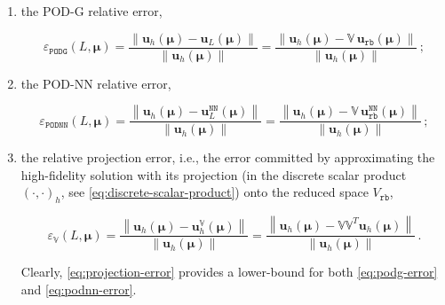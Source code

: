 \documentclass[longtitle]{elsarticle}
\numberwithin{equation}{section}
\theoremstyle{theorem}
\theoremstyle{definition}
\theoremstyle{remark}
\theoremstyle{proposition}
\numberwithin{figure}{section}
\newcommand{\norm}[1]{\left\lVert#1\right\rVert}
\newcommand{\bg}[1]{\boldsymbol{#1}}
\begin{document}
		\begin{enumerate}[label=(\alph*)]
			\item the POD-G relative error,
			\begin{linenomath}\begin{linenomath}\begin{equation}
				\label{eq:podg-error}
				\varepsilon_{\texttt{PODG}}^{}(L, \bg{\mu}) = \dfrac{\norm{\mathbf{u}_h(\bg{\mu}) - \mathbf{u}_L(\bg{\mu})}}{\norm{\mathbf{u}_h(\bg{\mu})}} = \dfrac{\norm{\mathbf{u}_h(\bg{\mu}) - \mathbb{V} \, \mathbf{u}_{\texttt{rb}}(\bg{\mu})}}{\norm{\mathbf{u}_h(\bg{\mu})}} \, ;
			\end{equation}\end{linenomath}\end{linenomath} 
			\item the POD-NN relative error,
			\begin{linenomath}\begin{linenomath}\begin{equation}
				\label{eq:podnn-error}
				\varepsilon_{\texttt{PODNN}}^{}(L, \bg{\mu}) = \dfrac{\norm{\mathbf{u}_h(\bg{\mu}) - \mathbf{u}_L^{\texttt{NN}}(\bg{\mu})}}{\norm{\mathbf{u}_h(\bg{\mu})}} = \dfrac{\norm{\mathbf{u}_h(\bg{\mu}) - \mathbb{V} \, \mathbf{u}_{\texttt{rb}}^{\texttt{NN}}(\bg{\mu})}}{\norm{\mathbf{u}_h(\bg{\mu})}} \, ;
			\end{equation}\end{linenomath}\end{linenomath} 
			\item the relative projection error, i.e., the error committed by approximating the high-fidelity solution with its projection (in the discrete scalar product $(\cdot,\cdot)_h$, see \eqref{eq:discrete-scalar-product}) onto the reduced space $V_{\texttt{rb}}$,
			\begin{linenomath}\begin{linenomath}\begin{equation}
				\label{eq:projection-error}
				\varepsilon_{\mathbb{V}}^{}(L, \bg{\mu}) = \dfrac{\norm{\mathbf{u}_h(\bg{\mu}) - \mathbf{u}_h^{\mathbb{V}}(\bg{\mu})}}{\norm{\mathbf{u}_h(\bg{\mu})}} = \dfrac{\norm{\mathbf{u}_h(\bg{\mu}) - \mathbb{V} \mathbb{V}^T \mathbf{u}_h(\bg{\mu})}}{\norm{\mathbf{u}_h(\bg{\mu})}} \, .
			\end{equation}\end{linenomath}\end{linenomath}
			Clearly, \eqref{eq:projection-error} provides a lower-bound for both \eqref{eq:podg-error} and \eqref{eq:podnn-error}.  
		\end{enumerate}
\end{document}

